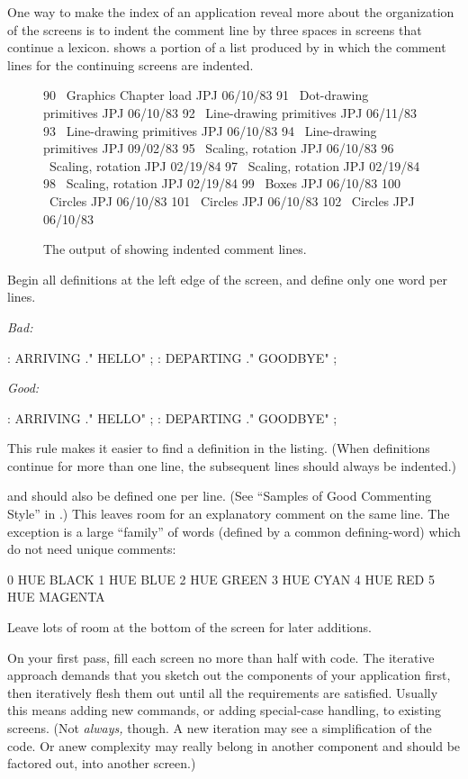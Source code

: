 One way to make the index of an application reveal more about the
organization of the screens is to indent the comment line by three spaces
in screens that continue a lexicon.   shows a portion of a list produced
by  in which the comment lines for the continuing screens
are indented.
\begin{figure*}[bbbb]
\caption{The output of  showing indented comment lines.}
\begin{Code}
 90 \ Graphics         Chapter load     JPJ 06/10/83
 91    \ Dot-drawing primitives         JPJ 06/10/83
 92 \ Line-drawing primitives           JPJ 06/11/83
 93    \ Line-drawing primitives        JPJ 06/10/83
 94    \ Line-drawing primitives        JPJ 09/02/83
 95 \ Scaling, rotation                 JPJ 06/10/83
 96    \ Scaling, rotation              JPJ 02/19/84
 97    \ Scaling, rotation              JPJ 02/19/84
 98    \ Scaling, rotation              JPJ 02/19/84
 99 \ Boxes                             JPJ 06/10/83
100 \ Circles                           JPJ 06/10/83
101    \ Circles                        JPJ 06/10/83
102    \ Circles                        JPJ 06/10/83
\end{Code}
\end{figure*}
\begin{tip}
Begin all definitions at the left edge of the screen, and define only one word
per lines.
\end{tip}
\emph{Bad:}
\begin{Code}
: ARRIVING ." HELLO" ;  : DEPARTING ." GOODBYE" ;
\end{Code}
\emph{Good:}
\begin{Code}
: ARRIVING  ." HELLO" ;
: DEPARTING ." GOODBYE" ;
\end{Code}
This rule makes it easier to find a definition in the listing.  (When definitions
continue for more than one line, the subsequent lines should always
be indented.)

 and  should also be defined one per
line.  (See ``Samples of Good Commenting Style'' in .) This
leaves room for an explanatory comment on the same line.  The exception
is a large ``family'' of words (defined by a common defining-word) which
do not need unique comments:
\begin{Code}
0 HUE BLACK     1 HUE BLUE      2 HUE GREEN
3 HUE CYAN      4 HUE RED       5 HUE MAGENTA
\end{Code}
\begin{tip}
Leave lots of room at the bottom of the screen for later additions.
\end{tip}
On your first pass, fill each screen no more than half with code.  The
iterative approach demands that you sketch out the components of your
application first, then iteratively flesh them out until all the
requirements are satisfied.  Usually this means adding new commands,
or adding special-case handling, to existing screens.  (Not
\emph{always,} though.  A new iteration may see a simplification of
the code.  Or anew complexity may really belong in another component
and should be factored out, into another screen.)


